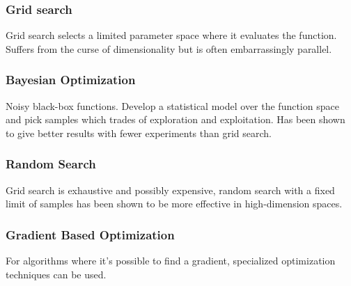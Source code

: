 \subsubsection{Grid search}

Grid search selects a limited parameter space where it evaluates the function. Suffers from the curse of dimensionality but is often embarrassingly parallel.


\subsubsection{Bayesian Optimization}

Noisy black-box functions. Develop a statistical model over the function space and pick samples which trades of exploration and exploitation. Has been shown \citep{snoek2012practical} to give better results with fewer experiments than grid search.


\subsubsection{Random Search}

Grid search is exhaustive and possibly expensive, random search with a fixed limit of samples has been shown to be more effective in high-dimension spaces. \citep{bergstra2012random}


\subsubsection{Gradient Based Optimization}

For algorithms where it's possible to find a gradient, specialized optimization techniques can be used.

